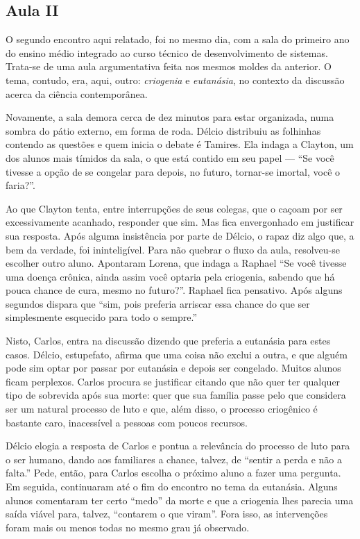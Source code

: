 \documentclass[12pt,a4paper]{article}
\begin{document}
    \subsection*{Aula II}
    
    O segundo encontro aqui relatado, foi no mesmo dia, com a sala do primeiro 
    ano do ensino médio integrado ao curso técnico de desenvolvimento de 
    sistemas. Trata-se de uma aula argumentativa feita nos mesmos moldes da 
    anterior. O tema, contudo, era, aqui, outro: \textit{criogenia} e 
    \textit{eutanásia}, no contexto da discussão acerca da ciência 
    contemporânea. 
    
    Novamente, a sala demora cerca de dez minutos para estar organizada, 
    numa sombra do pátio externo, em forma de roda. Délcio distribuiu as 
    folhinhas contendo as questões e quem inicia o debate é Tamires. Ela indaga 
    a Clayton, um dos alunos mais tímidos da sala, o que está contido em seu 
    papel --- ``Se você tivesse a opção de se congelar para depois, no futuro,  
    tornar-se imortal, você o faria?''. 
    
    Ao que Clayton tenta, entre interrupções de seus colegas, que o caçoam por 
    ser excessivamente acanhado, responder que sim. Mas fica envergonhado em 
    justificar sua resposta. Após alguma insistência por parte de Délcio, 
    o rapaz diz algo que, a bem da verdade, foi ininteligível. Para não quebrar 
    o fluxo da aula, resolveu-se escolher outro aluno. Apontaram Lorena, que 
    indaga a Raphael ``Se você tivesse uma doença crônica, ainda assim 
    você optaria pela criogenia, sabendo que há pouca chance de cura, mesmo 
    no futuro?''. Raphael fica pensativo. Após alguns segundos dispara que 
    ``sim, pois preferia arriscar essa chance do que ser simplesmente 
    esquecido para todo o sempre.'' 
    
    Nisto, Carlos, entra na discussão dizendo que preferia a eutanásia para 
    estes casos. Délcio, estupefato, afirma que uma coisa não exclui a outra, 
    e que alguém pode sim optar por passar por eutanásia e depois ser congelado. 
    Muitos alunos ficam perplexos. Carlos procura se justificar citando que 
    não quer ter qualquer tipo de sobrevida após sua morte: quer que sua 
    família passe pelo que considera ser um natural processo de luto e que, 
    além disso, o processo criogênico é bastante caro, inacessível a pessoas 
    com poucos recursos. 
    
    Délcio elogia a resposta de Carlos e pontua a relevância do processo de 
    luto para o ser humano, dando aos familiares a chance, talvez, de 
    ``sentir a perda e não a falta.'' Pede, então, para Carlos escolha o próximo 
    aluno  a fazer uma pergunta. Em seguida, continuaram até o fim do 
    encontro no tema da eutanásia. Alguns alunos comentaram ter certo ``medo'' 
    da morte e que a criogenia lhes parecia uma saída viável para, talvez, 
    ``contarem o que viram''. Fora isso, as intervenções foram mais ou menos 
    todas no mesmo grau já observado. 
    
\end{document}
